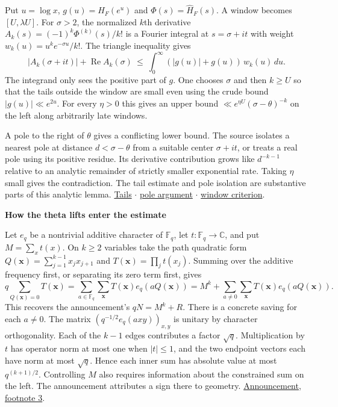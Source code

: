 \documentclass[11pt,letterpaper]{article}
\newcommand{\heading}[1]{{\sffamily\bfseries\fontsize{22}{25}\selectfont #1\par}\vspace{3pt}}
\newcommand{\subhead}[1]{\par\addvspace{5pt}{\sffamily\bfseries\large\color{accent}#1\par}\nobreak\vspace{-2pt}}
\newcommand{\notes}[1]{{\small\sffamily\color{muted}#1}}
\newcommand{\repobase}{https://github.com/TomasOrtega/RH/blob/a6ac91a412dcbaab31801355ec5707024a71bf65/extracted/lean/src/}
\newcommand{\src}[3]{\href{\repobase#1.lean\#L#2}{#3}}
\newcommand{\landau}{Development/AutomorphicArithmetic/DedekindLFunctions/LandauTheorems/}
\newcommand{\note}[2]{\href{https://alpo.ge/remark.pdf\#page=#1}{#2}}
\newcommand{\C}{\mathbb C}
\newcommand{\F}{\mathbb F}
\newcommand{\re}{\operatorname{Re}}
\begin{document}
Put $u=\log x$, $g(u)=H_F(e^u)$ and $\Phi(s)=\widehat H_F(s)$. A window becomes $[U,\lambda U]$. For $\sigma>2$, the normalized $k$th derivative $A_k(s)=(-1)^k\Phi^{(k)}(s)/k!$ is a Fourier integral at $s=\sigma+it$ with weight $w_k(u)=u^k e^{-\sigma u}/k!$. The triangle inequality gives
\[
 |A_k(\sigma+it)|+\re A_k(\sigma)
 \ \leq\ \int_0^\infty (|g(u)|+g(u))\,w_k(u)\,du.
\]
The integrand only sees the positive part of $g$. One chooses $\sigma$ and then $k\geq U$ so that the tails outside the window are small even using the crude bound $|g(u)|\ll e^{2u}$. For every $\eta>0$ this gives an upper bound $\ll e^{\eta U}(\sigma-\theta)^{-k}$ on the left along arbitrarily late windows.

A pole to the right of $\theta$ gives a conflicting lower bound. The source isolates a nearest pole at distance $d<\sigma-\theta$ from a suitable center $\sigma+it$, or treats a real pole using its positive residue. Its derivative contribution grows like $d^{-k-1}$ relative to an analytic remainder of strictly smaller exponential rate. Taking $\eta$ small gives the contradiction. The tail estimate and pole isolation are substantive parts of this analytic lemma. \notes{\src{\landau landauTails}{80}{Tails} $\cdot$ \src{\landau landauWindow}{83}{pole argument} $\cdot$ \src{\landau ZeroFreeOfRpowWindow}{11}{window criterion}.}

\newpage
{}
\heading{How the theta lifts enter the estimate}
\subhead{An exact calculation in the finite-field model}
Let $e_q$ be a nontrivial additive character of $\F_q$, let $t:\F_q\to\C$, and put $M=\sum_x t(x)$. On $k\geq2$ variables take the path quadratic form $Q(\mathbf x)=\sum_{j=1}^{k-1}x_jx_{j+1}$ and $T(\mathbf x)=\prod_j t(x_j)$. Summing over the additive frequency first, or separating its zero term first, gives
\[
 q\!\sum_{Q(\mathbf x)=0}T(\mathbf x)
 =\sum_{a\in\F_q}\sum_{\mathbf x} T(\mathbf x)e_q(aQ(\mathbf x))
 =M^k+\sum_{a\ne0}\sum_{\mathbf x}T(\mathbf x)e_q(aQ(\mathbf x)).
\]
This recovers the announcement's $qN=M^k+R$. There is a concrete saving for each $a\ne0$. The matrix $(q^{-1/2}e_q(axy))_{x,y}$ is unitary by character orthogonality. Each of the $k-1$ edges contributes a factor $\sqrt q$. Multiplication by $t$ has operator norm at most one when $|t|\leq1$, and the two endpoint vectors each have norm at most $\sqrt q$. Hence each inner sum has absolute value at most $q^{(k+1)/2}$. Controlling $M$ also requires information about the constrained sum on the left. The announcement attributes a sign there to geometry. \notes{\note{3}{Announcement, footnote 3}.}
\end{document}
